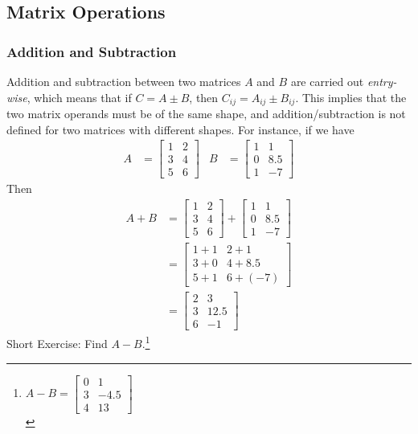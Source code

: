 \subsection{Matrix Operations}

\subsubsection{Addition and Subtraction}
Addition and subtraction between two matrices $A$ and $B$ are carried out \textit{entry-wise}, which means that if $C = A \pm B$, then $C_{ij} = A_{ij} \pm B_{ij}$. This implies that the two matrix operands must be of the same shape, and addition/subtraction is not defined for two matrices with different shapes. For instance, if we have
\begin{align*}
A &=
\begin{bmatrix}
1 & 2 \\
3 & 4 \\
5 & 6
\end{bmatrix} &
B &= 
\begin{bmatrix}
1 & 1 \\
0 & 8.5 \\
1 & -7
\end{bmatrix}
\end{align*}
Then
\begin{align*}
A+B &= 
\begin{bmatrix}
1 & 2 \\
3 & 4 \\
5 & 6
\end{bmatrix}
+
\begin{bmatrix}
1 & 1 \\
0 & 8.5 \\
1 & -7
\end{bmatrix} \\
&= 
\begin{bmatrix}
1+1 & 2+1 \\
3+0 & 4+8.5 \\
5+1 & 6+(-7)
\end{bmatrix} \\
&= 
\begin{bmatrix}
2 & 3 \\
3 & 12.5 \\
6 & -1
\end{bmatrix}
\end{align*}
Short Exercise: Find $A-B$.\footnote{$A-B = \begin{bmatrix}
0 & 1 \\
3 & -4.5 \\
4 & 13
\end{bmatrix}$\\}

